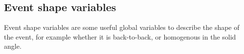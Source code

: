 \subsection{Event shape variables}
\label{sec:pandoraEvtShape}

Event shape variables are some useful global variables to describe the shape of the event, for example whether it is back-to-back, or homogenous in the solid angle.


